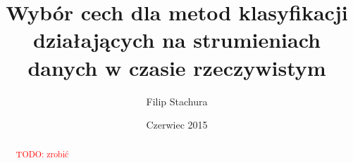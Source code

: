 \documentclass{alk}
\author{Filip Stachura}
\title{Wybór cech dla metod klasyfikacji działających na strumieniach danych w czasie rzeczywistym}
\date{Czerwiec 2015}
\newcommand\TODO[1]{\textcolor{red}{TODO: #1}}
\begin{document}
\maketitle

\begin{abstract}
  \TODO{zrobić}
\end{abstract}

\tableofcontents





\end{document}
